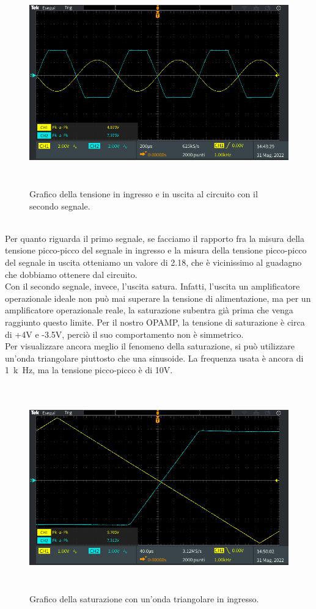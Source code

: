 \documentclass{report}
\begin{document}
\begin{figure}[h]
\centering
\includegraphics[height=8.9cm]{immagini/oscillo13}
\caption{Grafico della tensione in ingresso e in uscita al circuito con il secondo segnale.}
\label{figura:oscillo13}
\end{figure}
\\Per quanto riguarda il primo segnale, se facciamo il rapporto fra la misura della tensione picco-picco del segnale in ingresso e la misura della tensione picco-picco del segnale in uscita otteniamo un valore di 2.18, che è vicinissimo al guadagno che dobbiamo ottenere dal circuito.
\\\indent Con il secondo segnale, invece, l'uscita satura. Infatti, l'uscita un amplificatore operazionale ideale non può mai superare la tensione di alimentazione, ma per un amplificatore operazionale reale, la saturazione subentra già prima che venga raggiunto questo limite. Per il nostro OPAMP, la tensione di saturazione è circa di +4V e -3.5V, perciò il suo comportamento non è simmetrico.
\\Per visualizzare ancora meglio il fenomeno della saturazione, si può utilizzare un'onda triangolare piuttosto che una sinusoide. La frequenza usata è ancora di \SI{1}{k\hertz}, ma la tensione picco-picco è di 10V.
\begin{figure}[h!]
\centering
\includegraphics[height=8.9cm]{immagini/oscillo14}
\caption{Grafico della saturazione con un'onda triangolare in ingresso.}
\label{figura:oscillo14}
\end{figure}
\end{document}
